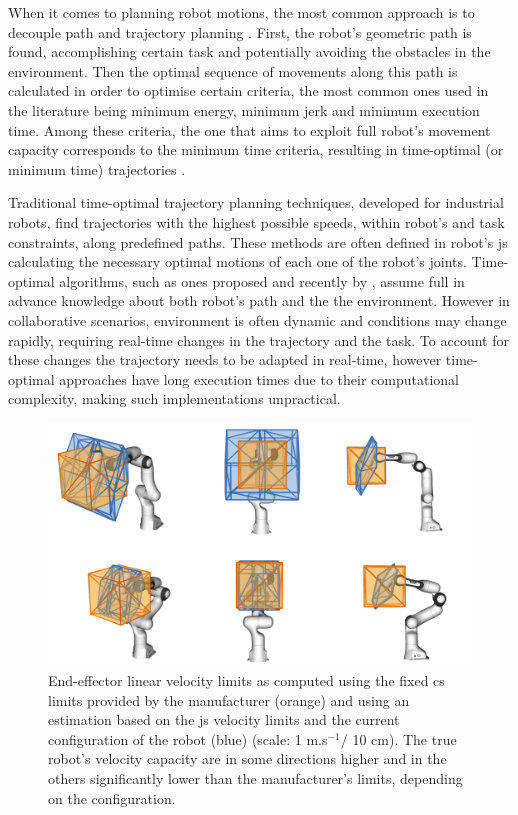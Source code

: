 
When it comes to planning robot motions, the most common approach is to decouple path and trajectory planning \cite{Pardo1996}. First, the robot's geometric path is found, accomplishing certain task and potentially avoiding the obstacles in the environment. Then the optimal sequence of movements along this path is calculated in order to optimise certain criteria, the most common ones used in the literature being minimum energy, minimum jerk and minimum execution time. Among these criteria, the one that aims to exploit full robot's movement capacity corresponds to the minimum time criteria, resulting in time-optimal (or minimum time) trajectories \cite{Gasparetto2012}. 

Traditional time-optimal trajectory planning techniques, developed for industrial robots, find trajectories with the highest possible speeds, within robot's and task constraints, along predefined paths. These methods are often defined in robot's \gls{js} calculating the necessary optimal motions of each one of the robot's joints. Time-optimal algorithms, such as ones proposed \citet{bobrow1985time} and recently by \citet{Pham2018}, assume full in advance knowledge about both robot's path and the the environment. However in collaborative scenarios, environment is often dynamic and conditions may change rapidly, requiring real-time changes in the trajectory and the task. To account for these changes the trajectory needs to be adapted in real-time, however time-optimal approaches have long execution times due to their computational complexity, making such implementations unpractical. 


\begin{figure}[!t]
    \centering
    \includegraphics[width=0.8\linewidth]{Papers/imgs/comp_poly2.png}
    \caption{End-effector linear velocity limits as computed using the fixed \gls{cs} limits provided by the manufacturer (orange) and using an estimation based on the \gls{js} velocity limits and the current configuration of the robot (blue) (scale: 1 m.s$^{-1}$/ 10 cm). The true robot's velocity capacity are in some directions higher and in the others significantly lower than the manufacturer's limits, depending on the configuration.}
    \label{fig:comp_cube_poly}
\end{figure}



